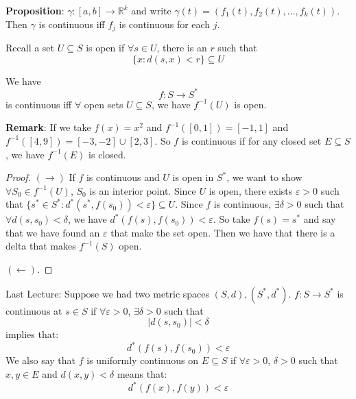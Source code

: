 \documentclass{report}
\begin{document}
\textbf{Proposition}: $\gamma: [a, b] \rightarrow \mathbb{R}^{k}$ and write $\gamma(t) = (f_{1}(t), f_{2}(t), \ldots , f_{k}(t))$. Then $\gamma$ is continuous iff $f_{j}$ is continuous for each $j$. 

Recall a set $U \subseteq S$ is open if $\forall  s \in U$, there is an $r$ such that
    \begin{equation*}
        \{x: d(s, x) < r\} \subseteq  U
    \end{equation*}

\begin{theorem}{21.3}
    We have
        \begin{equation*}
            f : S \rightarrow S^{*}
        \end{equation*}
    is continuous iff $\forall $ open sets $U \subseteq S$, we have $f^{-1}(U)$ is open.
\end{theorem}

\textbf{Remark}: If we take $f(x) = x^{2}$ and $f^{-1}([0, 1]) = [-1, 1]$ and $f^{-1}([4, 9]) = [-3, -2] \cup [2, 3]$. So $f$ is continuous if for any closed set $E \subseteq S$, we have $f^{-1}(E)$ is closed.
    \begin{proof}
        $(\rightarrow )$ If $f$ is continuous and $U$ is open in $S^{*}$, we want to show $\forall S_{0} \in f^{-1}(U)$, $S_{0}$ is an interior point. Since $U$ is open, there exists $\varepsilon> 0$ such that $\{s^{*} \in S^{*}: d^{*}(s^{*}, f(s_{0})) < \varepsilon \} \subseteq U$. Since $f$ is continuous, $\exists \delta > 0$ such that $\forall d(s, s_{0}) <\delta$, we have $d^{*}(f(s), f(s_{0})) < \varepsilon$. So take $f(s) = s^{*}$ and say that we have found an $\varepsilon$ that make the set open. Then we have that there is a delta that makes $f^{-1}(S)$ open.

        $(\leftarrow )$.
    \end{proof}

Last Lecture: Suppose we had two metric spaces $(S, d), (S^{*}, d^{*})$. $f : S \rightarrow S^{*}$ is continuous at $s \in S$ if $\forall \varepsilon > 0$, $\exists \delta > 0$ such that
    \begin{equation*}
        \lvert d(s, s_{0}) \rvert < \delta
    \end{equation*}
implies that:
    \begin{equation*}
        d^{*}(f(s), f(s_{0})) < \varepsilon
    \end{equation*}
We also say that $f$ is uniformly continuous on $E \subseteq S$ if $\forall \varepsilon> 0$, $\delta > 0$ such that $x, y \in E$ and $d(x, y) < \delta$ means that:
    \begin{equation*}
        d^{*}(f(x), f(y)) < \varepsilon
    \end{equation*}
\end{document}
